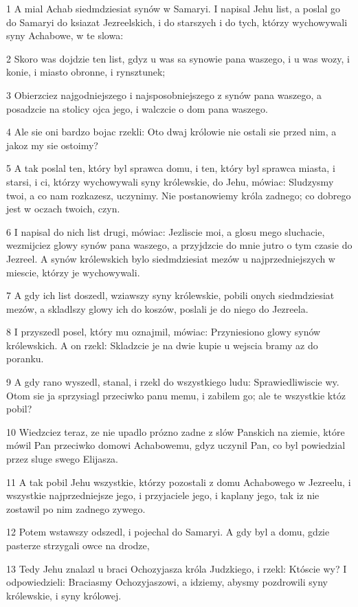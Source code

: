\par 1 A mial Achab siedmdziesiat synów w Samaryi. I napisal Jehu list, a poslal go do Samaryi do ksiazat Jezreelskich, i do starszych i do tych, którzy wychowywali syny Achabowe, w te slowa:
\par 2 Skoro was dojdzie ten list, gdyz u was sa synowie pana waszego, i u was wozy, i konie, i miasto obronne, i rynsztunek;
\par 3 Obierzciez najgodniejszego i najsposobniejszego z synów pana waszego, a posadzcie na stolicy ojca jego, i walczcie o dom pana waszego.
\par 4 Ale sie oni bardzo bojac rzekli: Oto dwaj królowie nie ostali sie przed nim, a jakoz my sie ostoimy?
\par 5 A tak poslal ten, który byl sprawca domu, i ten, który byl sprawca miasta, i starsi, i ci, którzy wychowywali syny królewskie, do Jehu, mówiac: Sludzysmy twoi, a co nam rozkazesz, uczynimy. Nie postanowiemy króla zadnego; co dobrego jest w oczach twoich, czyn.
\par 6 I napisal do nich list drugi, mówiac: Jezliscie moi, a glosu mego sluchacie, wezmijciez glowy synów pana waszego, a przyjdzcie do mnie jutro o tym czasie do Jezreel. A synów królewskich bylo siedmdziesiat mezów u najprzedniejszych w miescie, którzy je wychowywali.
\par 7 A gdy ich list doszedl, wziawszy syny królewskie, pobili onych siedmdziesiat mezów, a skladlszy glowy ich do koszów, poslali je do niego do Jezreela.
\par 8 I przyszedl posel, który mu oznajmil, mówiac: Przyniesiono glowy synów królewskich. A on rzekl: Skladzcie je na dwie kupie u wejscia bramy az do poranku.
\par 9 A gdy rano wyszedl, stanal, i rzekl do wszystkiego ludu: Sprawiedliwiscie wy. Otom sie ja sprzysiagl przeciwko panu memu, i zabilem go; ale te wszystkie któz pobil?
\par 10 Wiedzciez teraz, ze nie upadlo prózno zadne z slów Panskich na ziemie, które mówil Pan przeciwko domowi Achabowemu, gdyz uczynil Pan, co byl powiedzial przez sluge swego Elijasza.
\par 11 A tak pobil Jehu wszystkie, którzy pozostali z domu Achabowego w Jezreelu, i wszystkie najprzedniejsze jego, i przyjaciele jego, i kaplany jego, tak iz nie zostawil po nim zadnego zywego.
\par 12 Potem wstawszy odszedl, i pojechal do Samaryi. A gdy byl a domu, gdzie pasterze strzygali owce na drodze,
\par 13 Tedy Jehu znalazl u braci Ochozyjasza króla Judzkiego, i rzekl: Któscie wy? I odpowiedzieli: Braciasmy Ochozyjaszowi, a idziemy, abysmy pozdrowili syny królewskie, i syny królowej.

